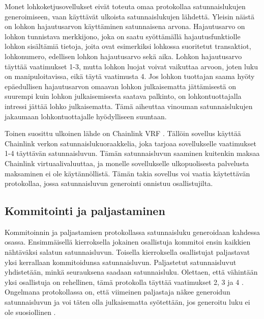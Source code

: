 \documentclass{article}
\begin{document}
Monet lohkoketjusovellukset eivät toteuta omaa protokollaa satunnaislukujen generoimiseen, vaan käyttävät ulkoista satunnaislukujen lähdettä. Yleisin näistä on lohkon hajautusarvon käyttäminen satunnaisena arvona. Hajautusarvo on lohkon tunnistava merkkijono, joka on saatu syöttämällä hajautusfunktiolle lohkon sisältämiä tietoja, joita ovat esimerkiksi lohkossa suoritetut transaktiot, lohkonumero, edellisen lohkon hajautusarvo sekä aika. Lohkon hajautusarvo täyttää vaatimukset 1-3, mutta lohkon luojat voivat vaikuttaa arvoon, joten luku on manipuloitavissa, eikä täytä vaatimusta 4. Jos lohkon tuottajan saama hyöty epäedullisen hajautusarvon omaavan lohkon julkaisematta jättämisestä on suurempi kuin lohkon julkaisemisesta saatava palkinto, on lohkontuottajalla intressi jättää lohko julkaisematta. Tämä aiheuttaa vinouman satunnaislukujen jakaumaan lohkontuottajalle hyödylliseen suuntaan.

Toinen suosittu ulkoinen lähde on Chainlink VRF \cite{noauthor_verifiable_2020}. Tällöin sovellus käyttää Chainlink verkon satunnaislukuoraakkelia, joka tarjoaa sovellukselle vaatimukset 1-4 täyttävän satunnaisluvun. Tämän satunnaisluvun saaminen kuitenkin maksaa Chainlink virtuaalivaluuttaa, ja monelle sovellukselle ulkopuolisesta palvelusta maksaminen ei ole käytännöllistä. Tämän takia sovellus voi vaatia käytettävän protokollaa, jossa satunnaisluvun generointi onnistuu osallistujilta.

\subsection{Kommitointi ja paljastaminen}
Kommitoinnin ja paljastamisen protokollassa satunnaisluku generoidaan kahdessa osassa. Ensimmäisellä kierroksella jokainen osallistuja kommitoi ensin kaikkien nähtäväksi salatun satunnaisluvun. Toisella kierroksella osallistujat paljastavat yksi kerrallaan kommitoidunsa satunnaisluvun. Paljastetut satunnaisluvut yhdistetään, minkä seurauksena saadaan satunnaisluku. Olettaen, että vähintään yksi osallistuja on rehellinen, tämä protokolla täyttää vaatimukset 2, 3 ja 4 \cite{simic_review_2020}. Ongelmana protokollassa on, että viimeinen paljastaja näkee generoidun satunnaisluvun ja voi täten olla julkaisematta syötettään, jos generoitu luku ei ole suosiollinen \cite{simic_review_2020}.
\end{document}
